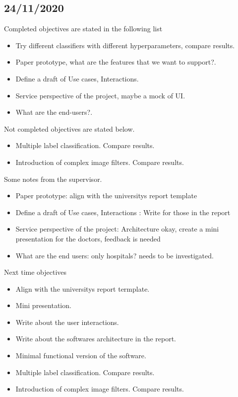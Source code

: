 \documentclass[a4paper,11pt,oneside]{book}
\begin{document}
	\subsection{24/11/2020}
	Completed objectives are stated in the following list
	\begin{itemize}
		\item Try different classifiers with different hyperparameters, compare results.
		\item Paper prototype, what are the features that we want to support?.
		\item Define a draft of Use cases, Interactions.
		\item Service perspective of the project, maybe a mock of UI.
		\item What are the end-users?.
	\end{itemize}
	Not completed objectives are stated below.
	\begin{itemize}
		\item Multiple label classification. Compare results.
		\item Introduction of complex image filters. Compare results.
	\end{itemize}
	Some notes from the supervisor. 
	\begin{itemize}
		\item Paper prototype: align with the universitys report template
		\item Define a draft of Use cases, Interactions : Write for those in the report
		\item Service perspective of the project: Architecture okay, create a mini presentation for the doctors, feedback is needed
		\item What are the end users: only hospitals? needs to be investigated.
	\end{itemize}
	Next time objectives
	\begin{itemize}
		\item Align with the universitys report termplate.
		\item Mini presentation.
		\item Write about the user interactions.
		\item Write about the softwares architecture in the report.
		\item Minimal functional version of the software.
		\item Multiple label classification. Compare results.
		\item Introduction of complex image filters. Compare results.
	\end{itemize}
\end{document}
